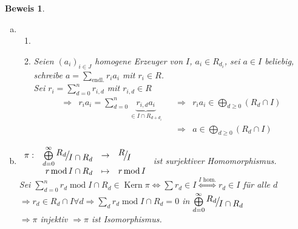 \documentclass[a4paper,12pt]{report}
\theoremstyle{break}
\theoremstyle{nonumberbreak}
\newtheorem{Bew}{Beweis}
\theoremstyle{nonumberplain}
\newcommand{\quot}[1]{\textrm{\glqq}{#1}\textrm{\grqq}}
\newenvironment{twosidedproof}{\begin{enumerate}[\quot{$\Rightarrow$}:]}{\end{enumerate}}
\newcommand{\proofforward}{\item[\quot{$\Rightarrow$}:]}
\newcommand{\proofreverse}{\item[\quot{$\Leftarrow$}:]}
\DeclareMathOperator{\Kern}{Kern}
\DeclareMathOperator{\modmodulo}{mod}%
\newcommand{\FakRaum}[2]{
  \raisebox{0.7ex}{\ensuremath{#1}}
  \ensuremath{\mkern-3mu}\big/\ensuremath{\mkern-3mu}
  \raisebox{-0.6ex}{\ensuremath{#2}}}
\begin{document}
\begin{Bew}\begin{enumerate}[a)]
\item[e)]\begin{twosidedproof}
\proofforward\checkmark

\proofreverse
	Seien $(a_i)_{i\in J}$ homogene Erzeuger von $I$, $a_i\in R_{d_i}$, sei $a\in I$ beliebig, schreibe $a = \sum\limits_{\text{endl.}}r_ia_i$ mit $r_i\in R$.\\
	Sei $r_i=\sum\limits_{d=0}^n r_{i,d}$ mit $r_{i,d}\in R$%
		\[\begin{array}{lrrr}\Rightarrow &
		r_ia_i=\sum_{d=0}^n \underbrace{r_{i,d}a_i}_{\in I\cap R_{d+d_i}} & \quad\Rightarrow & r_ia_i\in \bigoplus\limits_{d\ge0}(R_d\cap I)\\
		&& \quad \Rightarrow & a\in \bigoplus\limits_{d\ge0}(R_d\cap I)
		\end{array}\]
\end{twosidedproof}

\item[f)]
	$\begin{array}{crcl}
		\pi:&\bigoplus\limits_{d=0}^{\infty}\FakRaum{R_d}{I\cap R_d} &\to& \FakRaum{R}{I}\\
		&r\modmodulo I\cap R_d &\mapsto& r\modmodulo I
	\end{array}$ ist surjektiver Homomorphismus.\\
	Sei $\sum\limits_{d=0}^n r_d\modmodulo I\cap R_d\in \Kern{\pi} \Leftrightarrow \sum r_d\in I \overset{I\text{ hom.}}{\Longleftrightarrow} r_d\in I$ f\"ur alle $d$\\
	$\Rightarrow r_d\in R_d\cap I \forall d\Rightarrow \sum\limits_d r_d\modmodulo I\cap R_d=0$ in $\bigoplus\limits_{d=0}^{\infty}\FakRaum{R_d}{I\cap R_d}$\\
	$\Rightarrow \pi$ injektiv $\Rightarrow \pi$ ist Isomorphismus.


\end{enumerate}
\end{Bew}
\end{document}
